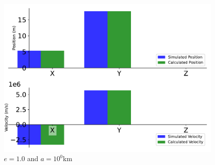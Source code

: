 \begin{figure}[htbp]\centerline{\includegraphics[height=0.7\textwidth, keepaspectratio]{AutoTeX/EquPara_1}}\caption{$e = 1.0$ and $a = 10^0$km}\label{fig:EquPara_1}\end{figure}
